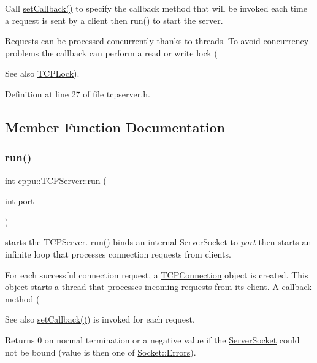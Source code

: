 Call \mbox{\hyperlink{classcppu_1_1_t_c_p_server_a7d4fdb93439015934004755fde72945b}{set\+Callback()}} to specify the callback method that will be invoked each time a request is sent by a client then \mbox{\hyperlink{classcppu_1_1_t_c_p_server_a98e00d62745812b17bdee9f07f2070c4}{run()}} to start the server.

Requests can be processed concurrently thanks to threads. To avoid concurrency problems the callback can perform a read or write lock (\begin{DoxySeeAlso}{See also}
\mbox{\hyperlink{classcppu_1_1_t_c_p_lock}{T\+C\+P\+Lock}}). 
\end{DoxySeeAlso}


Definition at line 27 of file tcpserver.\+h.



\subsection{Member Function Documentation}
\mbox{\label{classcppu_1_1_t_c_p_server_a98e00d62745812b17bdee9f07f2070c4}} 
\subsubsection{\texorpdfstring{run()}{run()}}
{\footnotesize\ttfamily int cppu\+::\+T\+C\+P\+Server\+::run (\begin{DoxyParamCaption}\item[{int}]{port }\end{DoxyParamCaption})\hspace{0.3cm}{\ttfamily [virtual]}}



starts the \mbox{\hyperlink{classcppu_1_1_t_c_p_server}{T\+C\+P\+Server}}. \mbox{\hyperlink{classcppu_1_1_t_c_p_server_a98e00d62745812b17bdee9f07f2070c4}{run()}} binds an internal \mbox{\hyperlink{classcppu_1_1_server_socket}{Server\+Socket}} to {\itshape port} then starts an infinite loop that processes connection requests from clients. 

For each successful connection request, a \mbox{\hyperlink{classcppu_1_1_t_c_p_connection}{T\+C\+P\+Connection}} object is created. This object starts a thread that processes incoming requests from its client. A callback method (\begin{DoxySeeAlso}{See also}
\mbox{\hyperlink{classcppu_1_1_t_c_p_server_a7d4fdb93439015934004755fde72945b}{set\+Callback()}}) is invoked for each request.
\end{DoxySeeAlso}
\begin{DoxyReturn}{Returns}
0 on normal termination or a negative value if the \mbox{\hyperlink{classcppu_1_1_server_socket}{Server\+Socket}} could not be bound (value is then one of \mbox{\hyperlink{classcppu_1_1_socket_a49ea5cb079bd7ae97ecf7eb30c9d9e5f}{Socket\+::\+Errors}}). 
\end{DoxyReturn}


